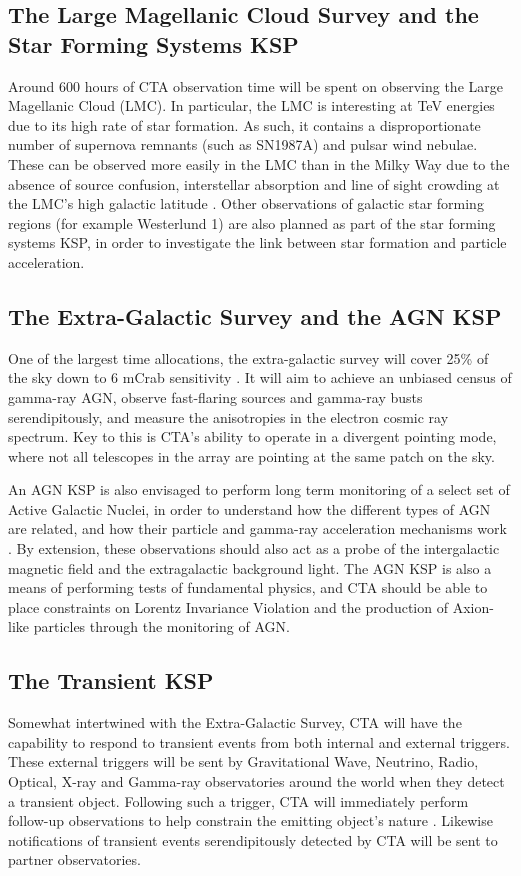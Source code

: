 \subsection{The Large Magellanic Cloud Survey and the Star Forming Systems KSP} Around 600 hours of CTA observation time will be spent on observing the Large Magellanic Cloud (LMC). In particular, the LMC is interesting at TeV energies due to its high rate of star formation. %
As such, it contains a disproportionate number of supernova remnants (such as SN1987A) and pulsar wind nebulae.  These can be observed more easily in the LMC than in the Milky Way due to the absence of source confusion, interstellar absorption and line of sight crowding at the LMC's high galactic latitude \cite{scienceCTA}. Other observations of galactic star forming regions (for example Westerlund 1) are also planned as part of the star forming systems KSP, in order to investigate the link between star formation and particle acceleration.

\subsection{The Extra-Galactic Survey and the AGN KSP} One of the largest time allocations, the extra-galactic survey will cover 25\% of the sky down to 6 mCrab sensitivity \cite{scienceCTA}. It will aim to achieve an unbiased census of gamma-ray AGN, observe fast-flaring sources and gamma-ray busts serendipitously, and measure the anisotropies in the electron cosmic ray spectrum. Key to this is CTA's ability to operate in a divergent pointing mode, where not all telescopes in the array are pointing at the same patch on the sky. 

An AGN KSP is also envisaged to perform long term monitoring of a select set of Active Galactic Nuclei, in order to understand how the different types of AGN are related, and how their particle and gamma-ray acceleration mechanisms work \cite{scienceCTA}. By extension, these observations should also act as a probe of the intergalactic magnetic field and the extragalactic background light. The AGN KSP is also a means of performing tests of fundamental physics, and CTA should be able to place constraints on Lorentz Invariance Violation and the production of Axion-like particles through the monitoring of AGN. 

\subsection{The Transient KSP} Somewhat intertwined with the Extra-Galactic Survey, CTA will have the capability to respond to transient events from both internal and external triggers. These external triggers will be sent by Gravitational Wave, Neutrino, Radio, Optical, X-ray and Gamma-ray observatories around the world when they detect a transient object. Following such a trigger, CTA will immediately perform follow-up observations to help constrain the emitting object's nature \cite{scienceCTA}. Likewise notifications of transient events serendipitously detected by CTA will be sent to partner observatories.

